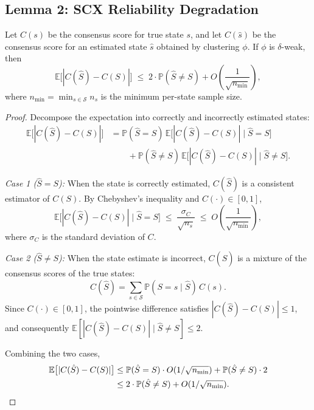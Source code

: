 \subsection{Lemma 2: SCX Reliability Degradation}
\label{sec:thm2:lemma2}

\begin{lemma}
\label{lem:scx-degradation}
Let $C(s)$ be the consensus score for true state $s$, and let $C(\hat{s})$
be the consensus score for an estimated state $\hat{s}$ obtained by clustering
$\phi$. If $\phi$ is $\delta$-weak, then
\begin{equation}
\mathbb{E}\bigl[|C(\hat{S}) - C(S)|\bigr]
\;\leq\; 2 \cdot \mathbb{P}(\hat{S} \neq S) + O\!\left(\frac{1}{\sqrt{n_{\min}}}\right),
\label{eq:degradation-bound}
\end{equation}
where $n_{\min} = \min_{s \in \mathcal{S}} n_s$ is the minimum per-state
sample size.
\end{lemma}

\begin{proof}
Decompose the expectation into correctly and incorrectly estimated states:
\begin{align*}
\mathbb{E}\bigl[|C(\hat{S}) - C(S)|\bigr]
&= \mathbb{P}(\hat{S} = S)\,
   \mathbb{E}\bigl[|C(\hat{S}) - C(S)| \mid \hat{S} = S\bigr] \\
&\qquad + \mathbb{P}(\hat{S} \neq S)\,
   \mathbb{E}\bigl[|C(\hat{S}) - C(S)| \mid \hat{S} \neq S\bigr].
\end{align*}

\emph{Case 1 ($\hat{S} = S$):} When the state is correctly estimated,
$C(\hat{S})$ is a consistent estimator of $C(S)$. By Chebyshev's inequality
and $C(\cdot) \in [0,1]$,
\[
\mathbb{E}\bigl[|C(\hat{S}) - C(S)| \mid \hat{S} = S\bigr]
\;\leq\; \frac{\sigma_C}{\sqrt{n_s}}
\;\leq\; O\!\left(\frac{1}{\sqrt{n_{\min}}}\right),
\]
where $\sigma_C$ is the standard deviation of $C$.

\emph{Case 2 ($\hat{S} \neq S$):} When the state estimate is incorrect,
$C(\hat{S})$ is a mixture of the consensus scores of the true states:
\[
C(\hat{S}) = \sum_{s \in \mathcal{S}} \mathbb{P}(S = s \mid \hat{S})\, C(s).
\]
Since $C(\cdot) \in [0,1]$, the pointwise difference satisfies
$|C(\hat{S}) - C(S)| \leq 1$, and consequently
$\mathbb{E}[|C(\hat{S}) - C(S)| \mid \hat{S} \neq S] \leq 2$.

Combining the two cases,
\begin{align*}
\mathbb{E}\bigl[|C(\hat{S}) - C(S)|\bigr]
&\leq \mathbb{P}(\hat{S}=S) \cdot O(1/\sqrt{n_{\min}})
   + \mathbb{P}(\hat{S}\neq S) \cdot 2 \\
&\leq 2 \cdot \mathbb{P}(\hat{S} \neq S) + O(1/\sqrt{n_{\min}}). \qedhere
\end{align*}
\end{proof}

